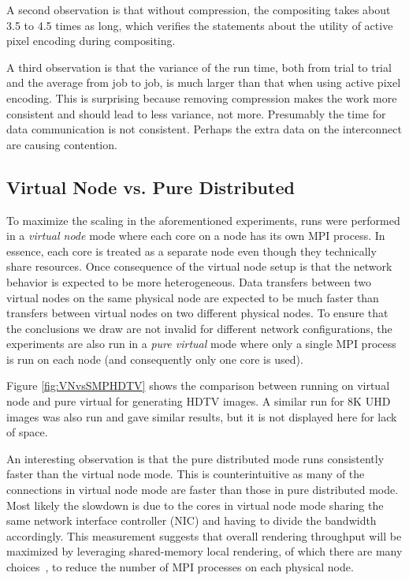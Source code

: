 \documentclass{vgtc}                          %
\newcommand*{\lcite}[1]{~\cite{#1}}
\newcommand*{\keyterm}[1]{\emph{#1}}
\begin{document}
A second observation is that without compression, the compositing takes about 3.5 to 4.5 times as long, which verifies the statements about the utility of active pixel encoding during compositing.

A third observation is that the variance of the run time, both from trial to trial and the average from job to job, is much larger than that when using active pixel encoding.
This is surprising because removing compression makes the work more consistent and should lead to less variance, not more.
Presumably the time for data communication is not consistent.
Perhaps the extra data on the interconnect are causing contention.

\subsection{Virtual Node vs. Pure Distributed}
\label{sec:VNCompare}

To maximize the scaling in the aforementioned experiments, runs were performed in a \keyterm{virtual node} mode where each core on a node has its own MPI process.
In essence, each core is treated as a separate node even though they technically share resources.
Once consequence of the virtual node setup is that the network behavior is expected to be more heterogeneous.
Data transfers between two virtual nodes on the same physical node are expected to be much faster than transfers between virtual nodes on two different physical nodes.
To ensure that the conclusions we draw are not invalid for different network configurations, the experiments are also run in a \keyterm{pure virtual} mode where only a single MPI process is run on each node (and consequently only one core is used).

Figure \ref{fig:VNvsSMPHDTV} shows the comparison between running on virtual node and pure virtual for generating HDTV images.
A similar run for 8K UHD images was also run and gave similar results, but it is not displayed here for lack of space.

An interesting observation is that the pure distributed mode runs consistently faster than the virtual node mode.
This is counterintuitive as many of the connections in virtual node mode are faster than those in pure distributed mode.
Most likely the slowdown is due to the cores in virtual node mode sharing the same network interface controller (NIC) and having to divide the bandwidth accordingly.
This measurement suggests that overall rendering throughput will be maximized by leveraging shared-memory local rendering, of which there are many choices\lcite{OpenSWR,Wald2014,Knoll2014,Larsen2015:RayTrace,Moreland2016:VTKm}, to reduce the number of MPI processes on each physical node.
\end{document}
